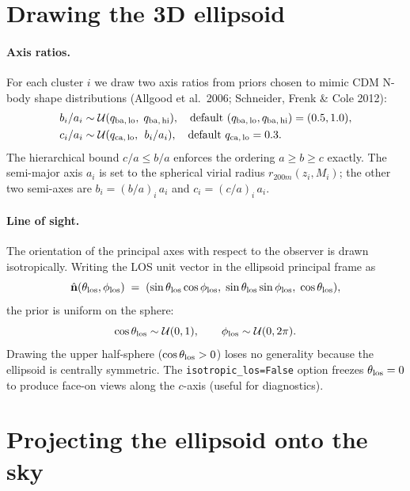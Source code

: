 \documentclass[11pt,a4paper]{article}
\newcommand{\unitvec}[1]{\hat{\mathbf{#1}}}
\begin{document}
\section{Drawing the 3D ellipsoid}
\label{sec:draw}

\paragraph{Axis ratios.}
For each cluster $i$ we draw two axis ratios from priors chosen to mimic
CDM N-body shape distributions (Allgood et al.~2006; Schneider, Frenk
\& Cole 2012):
\begin{align}
b_i/a_i &\sim \mathcal{U}(q_{\rm ba,\,lo},\;q_{\rm ba,\,hi}),
   \quad \text{default } (q_{\rm ba,\,lo}, q_{\rm ba,\,hi}) = (0.5, 1.0),\\
c_i/a_i &\sim \mathcal{U}(q_{\rm ca,\,lo},\;\,b_i/a_i),
   \quad \text{default } q_{\rm ca,\,lo} = 0.3.
\end{align}
The hierarchical bound $c/a \le b/a$ enforces the ordering
$a \ge b \ge c$ exactly. The semi-major axis $a_i$ is set to the spherical
virial radius $r_{200m}(z_i, M_i)$; the other two semi-axes are
$b_i = (b/a)_i\, a_i$ and $c_i = (c/a)_i\, a_i$.

\paragraph{Line of sight.}
The orientation of the principal axes with respect to the observer is
drawn isotropically. Writing the LOS unit vector
in the ellipsoid principal frame as
\begin{equation}
\unitvec{n}(\theta_{\rm los}, \phi_{\rm los})
 \;=\; (\sin\theta_{\rm los}\cos\phi_{\rm los},\;
        \sin\theta_{\rm los}\sin\phi_{\rm los},\;
        \cos\theta_{\rm los}),
\end{equation}
the prior is uniform on the sphere:
\begin{equation}
\cos\theta_{\rm los} \sim \mathcal{U}(0, 1),\qquad
\phi_{\rm los}       \sim \mathcal{U}(0, 2\pi).
\end{equation}
Drawing the upper half-sphere ($\cos\theta_{\rm los} > 0$) loses no
generality because the ellipsoid is centrally symmetric. The
\verb|isotropic_los=False| option freezes $\theta_{\rm los}=0$ to
produce face-on views along the $c$-axis (useful for diagnostics).

\section{Projecting the ellipsoid onto the sky}
\label{sec:proj}
\end{document}
